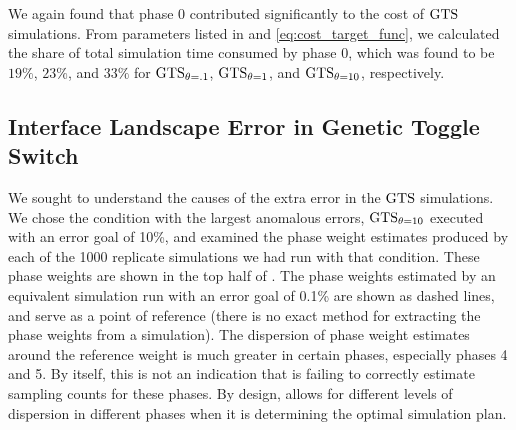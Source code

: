 We again found that phase 0 contributed significantly to the cost of $\text{GTS}$ simulations. From parameters listed in  and \eqref{eq:cost_target_func}, we calculated the share of total simulation time consumed by phase 0, which was found to be $19\%$, $23\%$, and  $33\%$ for $\text{GTS}_{\theta=.1}$, $\text{GTS}_{\theta=1}$, and $\text{GTS}_{\theta=10}$, respectively.

\subsection{Interface Landscape Error in Genetic Toggle Switch}
\label{sec:landscape_error}

We sought to understand the causes of the extra error in the $\text{GTS}$ simulations. We chose the condition with the largest anomalous errors, $\text{GTS}_{\theta=10}$ executed with an error goal of 10\%, and examined the phase weight estimates produced by each of the 1000 replicate simulations we had run with that condition. These phase weights are shown in the top half of . The phase weights estimated by an equivalent  simulation run with an error goal of 0.1\% are shown as dashed lines, and serve as a point of reference (there is no exact method for extracting the phase weights from a  simulation). The dispersion of phase weight estimates around the reference weight is much greater in certain phases, especially phases 4 and 5. By itself, this is not an indication that  is failing to correctly estimate sampling counts for these phases. By design,  allows for different levels of dispersion in different phases when it is determining the optimal simulation plan.

